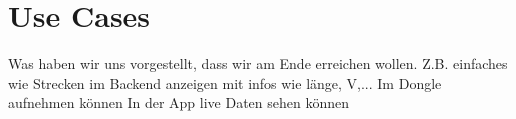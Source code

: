 \chapter{Use Cases}

Was haben wir uns vorgestellt, dass wir am Ende erreichen wollen. 
Z.B. einfaches wie Strecken im Backend anzeigen mit infos wie länge, V,...
Im Dongle aufnehmen können
In der App live Daten sehen können

  

 
 
 
 
 
 
 
 
